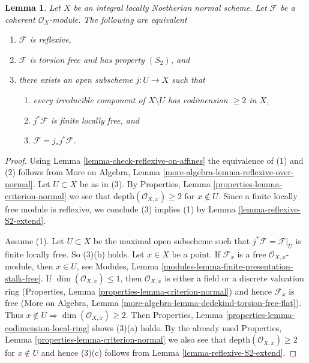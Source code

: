 \documentclass[10pt,a4paper]{amsart}
\theoremstyle{plain}
\newtheorem{lemma}[subsection]{Lemma}
\theoremstyle{definition}
\theoremstyle{remark}
\numberwithin{equation}{subsection}
\begin{document}
\begin{lemma}
\label{lemma-reflexive-over-normal}
Let $X$ be an integral locally Noetherian normal scheme.
Let $\mathcal{F}$ be a coherent $\mathcal{O}_X$-module.
The following are equivalent
\begin{enumerate}
\item $\mathcal{F}$ is reflexive,
\item $\mathcal{F}$ is torsion free and has property $(S_2)$, and
\item there exists an open subscheme $j : U \to X$ such that
\begin{enumerate}
\item every irreducible component of $X \setminus U$
has codimension $\geq 2$ in $X$,
\item $j^*\mathcal{F}$ is finite locally free, and
\item $\mathcal{F} = j_*j^*\mathcal{F}$.
\end{enumerate}
\end{enumerate}
\end{lemma}

\begin{proof}
Using Lemma \ref{lemma-check-reflexive-on-affines}
the equivalence of (1) and (2) follows from
More on Algebra, Lemma \ref{more-algebra-lemma-reflexive-over-normal}.
Let $U \subset X$ be as in (3). By
Properties, Lemma \ref{properties-lemma-criterion-normal}
we see that $\text{depth}(\mathcal{O}_{X, x}) \geq 2$
for $x \not \in U$. Since a finite locally free module is reflexive,
we conclude (3) implies (1) by Lemma \ref{lemma-reflexive-S2-extend}.

\medskip\noindent
Assume (1). Let $U \subset X$ be the maximal open subscheme such
that $j^*\mathcal{F} = \mathcal{F}|_U$
is finite locally free. So (3)(b) holds. Let $x \in X$ be a point.
If $\mathcal{F}_x$ is a free $\mathcal{O}_{X, x}$-module, then
$x \in U$, see
Modules, Lemma \ref{modules-lemma-finite-presentation-stalk-free}.
If $\dim(\mathcal{O}_{X, x}) \leq 1$, then $\mathcal{O}_{X, x}$
is either a field or a discrete valuation ring
(Properties, Lemma \ref{properties-lemma-criterion-normal})
and hence $\mathcal{F}_x$ is free (More on Algebra, Lemma
\ref{more-algebra-lemma-dedekind-torsion-free-flat}).
Thus $x \not \in U \Rightarrow \dim(\mathcal{O}_{X, x}) \geq 2$.
Then Properties, Lemma \ref{properties-lemma-codimension-local-ring}
shows (3)(a) holds. By the already used
Properties, Lemma \ref{properties-lemma-criterion-normal}
we also see that $\text{depth}(\mathcal{O}_{X, x}) \geq 2$
for $x \not \in U$ and hence (3)(c) follows from
Lemma \ref{lemma-reflexive-S2-extend}.
\end{proof}
\end{document}
